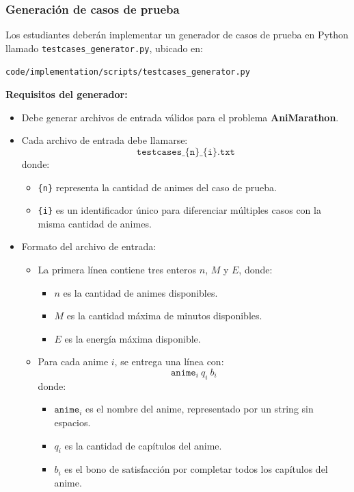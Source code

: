 \subsubsection{Generación de casos de prueba}

Los estudiantes deberán implementar un generador de casos de prueba en Python llamado \texttt{testcases\_generator.py}, ubicado en:

\begin{center}
    \texttt{code/implementation/scripts/testcases\_generator.py}
\end{center}

\textbf{Requisitos del generador:}
\begin{itemize}
    \item Debe generar archivos de entrada válidos para el problema \textbf{AniMarathon}.
    \item Cada archivo de entrada debe llamarse:
    \[
        \texttt{testcases\_\{n\}\_\{i\}.txt}
    \]
    donde:
    \begin{itemize}
        \item \texttt{\{n\}} representa la cantidad de animes del caso de prueba.
        \item \texttt{\{i\}} es un identificador único para diferenciar múltiples casos con la misma cantidad de animes.
    \end{itemize}

    \item Formato del archivo de entrada:
    \begin{itemize}
        \item La primera línea contiene tres enteros $n$, $M$ y $E$, donde:
        \begin{itemize}
            \item $n$ es la cantidad de animes disponibles.
            \item $M$ es la cantidad máxima de minutos disponibles.
            \item $E$ es la energía máxima disponible.
        \end{itemize}

        \item Para cada anime $i$, se entrega una línea con:
        \[
        \texttt{anime}_i \ q_i \ b_i
        \]
        donde:
        \begin{itemize}
            \item $\texttt{anime}_i$ es el nombre del anime, representado por un string sin espacios.
            \item $q_i$ es la cantidad de capítulos del anime.
            \item $b_i$ es el bono de satisfacción por completar todos los capítulos del anime.
        \end{itemize}


\end{itemize}
\end{itemize}
